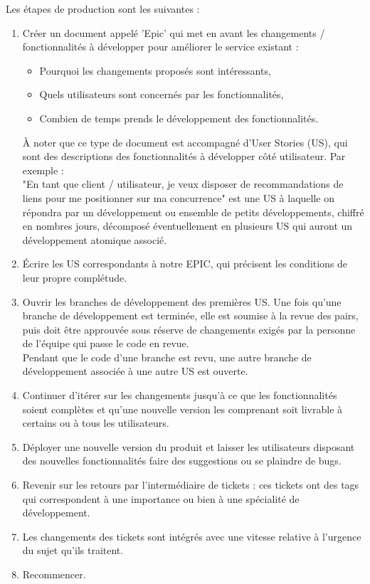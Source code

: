 \documentclass{rapportCS}
\begin{document}
Les étapes de production sont les suivantes :
\begin{enumerate}
  \item Créer un document appelé 'Epic' qui met en avant les changements / fonctionnalités à développer
  pour améliorer le service existant : 
  \begin{itemize}
    \item Pourquoi les changements proposés sont intéressants, 
    \item Quels utilisateurs sont concernés par les fonctionnalités,
    \item Combien de temps prends le développement des fonctionnalités. 
  \end{itemize} 
  À noter que ce type de document est accompagné d'User Stories (US), qui sont des descriptions des fonctionnalités
  à développer côté utilisateur. Par exemple : \\
  "En tant que client / utilisateur, je veux disposer de recommandations de liens pour me positionner 
  sur ma concurrence" est une US à laquelle on répondra par un développement ou ensemble
  de petits développements, chiffré en nombres jours, décomposé éventuellement en plusieurs
  US qui auront un développement atomique associé.
  \item Écrire les US correspondants à notre EPIC, qui précisent les conditions de leur propre complétude.
  \item Ouvrir les branches de développement des premières US. Une fois qu'une branche de développement est terminée,
  elle est soumise à la revue des pairs, puis doit être approuvée sous réserve de changements exigés par la personne
  de l'équipe qui passe le code en revue.\\
  Pendant que le code d'une branche est revu, une autre branche de développement associée à une autre US est ouverte.
  \item Continuer d'itérer sur les changements jusqu'à ce que les fonctionnalités soient complètes et qu'une
  nouvelle version les comprenant soit livrable à certains ou à tous les utilisateurs.
  \item Déployer une nouvelle version du produit et laisser les utilisateurs disposant des nouvelles fonctionnalités
  faire des suggestions ou se plaindre de bugs.
  \item Revenir sur les retours par l'intermédiaire de tickets : ces tickets ont des tags qui correspondent
  à une importance ou bien à une spécialité de développement.
  \item Les changements des tickets sont intégrés avec une vitesse relative à l'urgence du sujet qu'ils traitent.
  \item Recommencer.
\end{enumerate}
\end{document}
